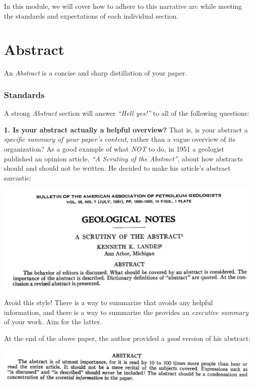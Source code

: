 \documentclass[
]{book}
\begin{document}
In this module, we will cover how to adhere to this narrative arc while meeting the standards and expectations of each individual section.

\hypertarget{abstract}{%
\section*{Abstract}\label{abstract}}

An \emph{Abstract} is a concise and sharp distillation of your paper.

\hypertarget{standards}{%
\subsubsection*{Standards}\label{standards}}

A strong \emph{Abstract} section will answer \emph{``Hell yes!''} to all of the following questions:

\textbf{1. Is your abstract actually a helpful overview?} That is, is your abstract a \emph{specific summary of your paper's content}, rather than a vague overview of its organization? As a good example of what \emph{NOT} to do, in 1951 a geologist published an opinion article, \emph{``A Scrutiny of the Abstract''}, about how abstracts should and should not be written. He decided to make his article's abstract sarcastic:

\includegraphics{img/abstracts-bad.png}

Avoid this style! There is a way to summarize that avoids any helpful information, and there is a way to summarize the provides an \emph{executive summary} of your work. Aim for the latter.

At the end of the above paper, the author provided a \emph{good} version of his abstract:

\includegraphics{img/abstracts-good.png}
\end{document}
